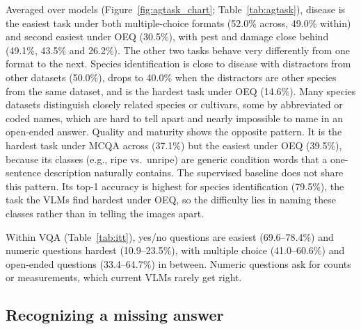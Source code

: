 \documentclass[10pt,letterpaper]{article}
\newcommand{\tablefont}{\footnotesize}
\begin{document}
Averaged over models (Figure~\ref{fig:agtask_chart}; Table~\ref{tab:agtask}), disease is the easiest task under both multiple-choice formats (52.0\% across, 49.0\% within) and second easiest under OEQ (30.5\%), with pest and damage close behind (49.1\%, 43.5\% and 26.2\%). The other two tasks behave very differently from one format to the next. Species identification is close to disease with distractors from other datasets (50.0\%), drops to 40.0\% when the distractors are other species from the same dataset, and is the hardest task under OEQ (14.6\%). Many species datasets distinguish closely related species or cultivars, some by abbreviated or coded names, which are hard to tell apart and nearly impossible to name in an open-ended answer. Quality and maturity shows the opposite pattern. It is the hardest task under MCQA across (37.1\%) but the easiest under OEQ (39.5\%), because its classes (e.g., ripe vs.\ unripe) are generic condition words that a one-sentence description naturally contains. The supervised baseline does not share this pattern. Its top-1 accuracy is highest for species identification (79.5\%), the task the VLMs find hardest under OEQ, so the difficulty lies in naming these classes rather than in telling the images apart.

\begin{table}[!tp]
\centering
\caption{VQA accuracy (\%) by question format, pooled over the questions of all 13 datasets and averaged over generation seeds. $N$ is the number of questions. Open-ended answers are graded by the LLM judge. ROUGE-L (\%) is computed on open-ended answers against the reference answer without the judge. Best value per column in bold. The last row is the chance baseline (Section~\ref{sec:baselines}), which does not answer open-ended questions. $^\dagger$Self-judged on open-ended questions.}
\label{tab:itt}
\renewcommand{\arraystretch}{1.2}
\tablefont

\end{table}

Within VQA (Table~\ref{tab:itt}), yes/no questions are easiest (69.6--78.4\%) and numeric questions hardest (10.9--23.5\%), with multiple choice (41.0--60.6\%) and open-ended questions (33.4--64.7\%) in between. Numeric questions ask for counts or measurements, which current VLMs rarely get right.

\subsection{Recognizing a missing answer}
\label{sec:results_nota}
\end{document}
